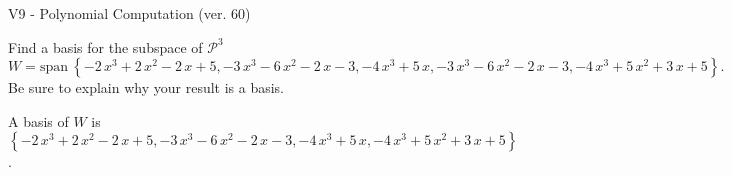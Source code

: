 \begin{exercise}
  \begin{exerciseTitle}V9 - Polynomial Computation (ver. 60)\end{exerciseTitle}
  \begin{exerciseStatement}
    Find a basis for the subspace of \(\mathcal{P}^3\) 
\[W=\mathrm{span}\ \left\{-2 \, x^{3} + 2 \, x^{2} - 2 \, x + 5 , -3 \, x^{3} - 6 \, x^{2} - 2 \, x - 3 , -4 \, x^{3} + 5 \, x , -3 \, x^{3} - 6 \, x^{2} - 2 \, x - 3 , -4 \, x^{3} + 5 \, x^{2} + 3 \, x + 5\right\}.\]
 Be sure to explain why your result is a basis.


  \end{exerciseStatement}
  \begin{exerciseAnswer}
   A basis of \(W\) is  \(\left\{-2 \, x^{3} + 2 \, x^{2} - 2 \, x + 5 , -3 \, x^{3} - 6 \, x^{2} - 2 \, x - 3 , -4 \, x^{3} + 5 \, x , -4 \, x^{3} + 5 \, x^{2} + 3 \, x + 5\right\}\).
  


  \end{exerciseAnswer}
\end{exercise}